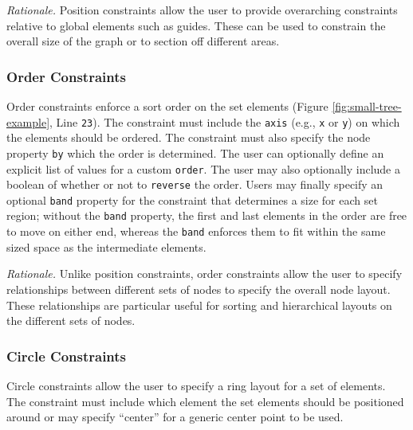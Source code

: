 \emph{Rationale.} Position constraints allow the user to provide
overarching constraints relative to global elements such as guides. These
can be used to constrain the overall size of the graph or to section off
different areas. 


\subsubsection{Order Constraints}
 Order constraints enforce a sort order on the set
elements (Figure \ref{fig:small-tree-example}, Line \texttt{23}). The
constraint must include the \texttt{axis} (e.g., \texttt{x} or \texttt{y})
on which the elements should be ordered. The constraint must also specify
the node property \texttt{by} which the order is determined. The user can
optionally define an explicit list of values for a custom
\texttt{order}. The user may also optionally include a boolean of whether
or not to \texttt{reverse} the order. Users may finally specify an optional
\texttt{band} property for the constraint that determines a size for each
set region; without the \texttt{band} property, the first and last elements
in the order are free to move on either end, whereas the \texttt{band}
enforces them to fit within the same sized space as the intermediate
elements. 


\emph{Rationale.} Unlike position constraints, order constraints allow the
user to specify relationships between different sets of nodes to specify
the overall node layout. These relationships are particular useful for
sorting and hierarchical layouts on the different sets of nodes.

\subsubsection{Circle Constraints}
 Circle
constraints allow the user to specify a ring layout for a set of
elements. The constraint must include which element the set elements should
be positioned around or may specify ``center'' for a generic center point
to be used.

